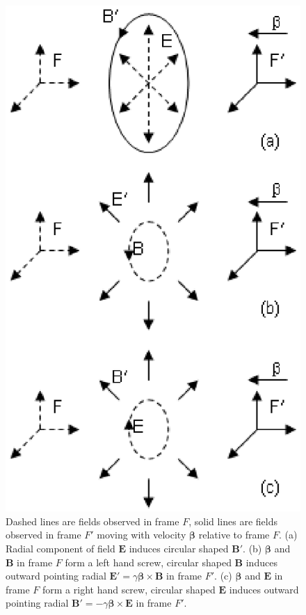 \documentclass[prd,showpacs,twocolumn]{revtex4-1}
\begin{document}
\begin{figure}
\center
\includegraphics{f1.eps}
\caption{Dashed lines are fields observed in frame $F$, solid lines are fields observed in frame $F'$ moving with velocity $\boldsymbol\beta$ relative to frame $F$. (a) Radial component of field $\mathbf{E}$ induces circular shaped $\mathbf{B'}$. (b) $\boldsymbol\beta$ and $\mathbf{B}$ in frame $F$ form a left hand screw, circular shaped $\mathbf{B}$ induces outward pointing radial $\mathbf{E'}=\gamma\boldsymbol\beta\times\mathbf{B}$ in frame $F'$. (c) $\boldsymbol\beta$ and $\mathbf{E}$ in frame $F$ form a right hand screw, circular shaped $\mathbf{E}$ induces outward pointing radial $\mathbf{B'}=-\gamma\boldsymbol\beta\times\mathbf{E}$ in frame $F'$.}
\label{fig:fieldtransformation}
\end{figure}
\end{document}
